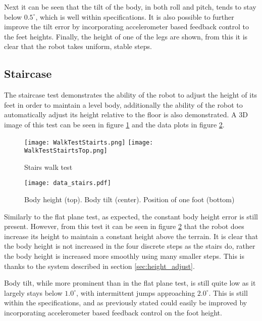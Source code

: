     Next it can be seen that the tilt of the body, in both roll and pitch, tends to stay below \(0.5^\circ\), which is well within specifications. It is also possible to further improve
    the tilt error by incorporating accelerometer based feedback control to the feet heights. Finally, the height of one of the legs are shown, from this it is clear that the robot takes
    uniform, stable steps.

    \newpage
    \subsection{Staircase}
    The staircase test demonstrates the ability of the robot to adjust the height of its feet in order to maintain a level body,
    additionally the ability of the robot to automatically adjust its height relative to the floor is also demonstrated. A 3D image
    of this test can be seen in figure \ref{fig:stairs_test} and the data plots in figure \ref{fig:stairs_test_data}.
    \begin{figure}[h]
        \centering
        \texttt{[image: WalkTestStairts.png]}
        \texttt{[image: WalkTestStairtsTop.png]}
        \caption{Stairs walk test}
        \label{fig:stairs_test}
    \end{figure}
    \begin{figure}[h]
        \centering
        \texttt{[image: data\_stairs.pdf]}
        \caption{Body height (top). Body tilt (center). Position of one foot (bottom)}
        \label{fig:stairs_test_data}
    \end{figure}

    Similarly to the flat plane test, as expected, the constant body height error is still present.
    However, from this test it can be seen in figure \ref{fig:stairs_test_data} that the robot does increase its height to maintain a constant
    height above the terrain. It is clear that the body height is not increased in the four discrete steps as the stairs do, rather the
    body height is increased more smoothly using many smaller steps. This is thanks to the system described in section \ref{sec:height_adjust}.

    Body tilt, while more prominent than in the flat plane test, is still quite low as it largely stays below \(1.0^\circ\), with intermittent jumps approaching \(2.0^\circ\).
    This is still within the specifications, and as previously stated could easily be improved by incorporating accelerometer based feedback control on the foot height.

